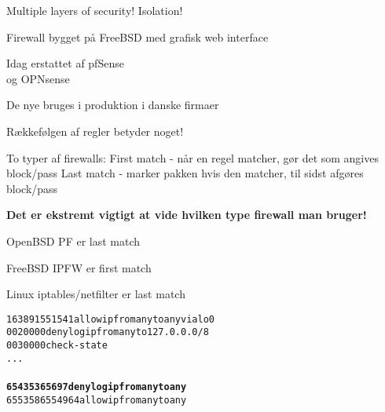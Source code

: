 \documentclass[Screen16to9,17pt]{foils}
\begin{document}

\centerline{\hlkbig\color{security6blue} Multiple layers of security! Isolation!}










\begin{list1}
\item Firewall bygget på FreeBSD med grafisk web interface
\item Idag erstattet af pfSense \\
og OPNsense 
\item De nye bruges i produktion i danske firmaer
\end{list1}


\begin{list1}
\item Rækkefølgen af regler betyder noget!
\begin{list2}
\item To typer af firewalls:
 First match - når en regel matcher, gør det som angives block/pass
 Last match  - marker pakken hvis den matcher, til sidst afgøres block/pass
\end{list2}
\item {\bf Det er ekstremt vigtigt at vide hvilken type firewall
    man bruger!}
\item OpenBSD PF er last match
\item FreeBSD IPFW er first match
\item Linux iptables/netfilter er last match
\end{list1}






\begin{alltt}
 16389  1551541 allow ip from any to any via lo0
00200     0        0 deny log ip from any to 127.0.0.0/8
00300     0        0 check-state
...
{\bfseries
65435    36     5697 deny log ip from any to any}
65535   865    54964 allow ip from any to any
\end{alltt}
\end{document}
